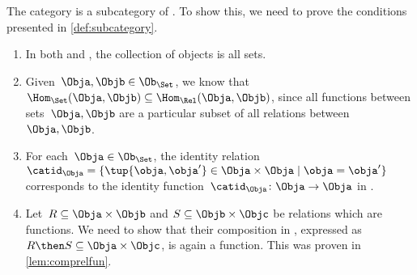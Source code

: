 \begin{example}
  The category \Set is a subcategory of \Rel. To show this, we need to prove the conditions presented in \cref{def:subcategory}.
  \begin{enumerate}
    \item In both \Rel and \Set, the collection of objects is all sets.
    \item Given~$\Obja,\Objb\in \Ob_{\Set}$, we know that~$\Hom_{\Set}(\Obja,\Objb)\subseteq \Hom_{\Rel}(\Obja,\Objb)$, since all functions between sets~$\Obja,\Objb$ are a particular subset of all relations between~$\Obja,\Objb$.
    \item For each~$\Obja \in \Ob_{\Set}$, the identity relation~$\catid_\Obja=\{\tup{\obja,\obja'}\in \Obja\times \Obja \mid \obja=\obja'\}$ corresponds to the identity function~$\catid_\Obja \colon \Obja \to \Obja$ in \Set.
    \item Let~$R\subseteq \Obja\times \Objb$ and $S\subseteq \Objb \times \Objc$ be relations which are functions. We need to show that their composition in \Rel, expressed as~$R\then S\subseteq \Obja\times \Objc$, is again a function. This was proven in \cref{lem:comprelfun}.
  \end{enumerate}

\end{example}


